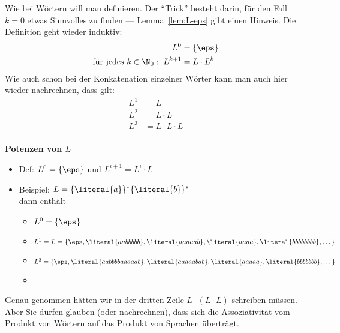 Wie bei Wörtern will man  definieren. 
%
Der "`Trick"' besteht darin, für den Fall $k=0$
etwas Sinnvolles zu finden --- Lemma~\ref{lem:L-eps} gibt einen Hinweis. 
%
Die Definition geht wieder induktiv:
\begin{align*}
  L^0 &= \{\eps\} \\
  \text{für jedes } k\in\N_0:\; L^{k+1} &= L \cdot L^k
\end{align*}
%
Wie auch schon bei der Konkatenation einzelner Wörter kann man auch hier
wieder nachrechnen, dass \zB gilt:
\begin{align*}
  L^1 &= L \\
  L^2 &= L\cdot L \\
  L^3 &= L\cdot L\cdot L \\
\end{align*}
%
\begin{tutorium}
  \noindent\textbf{Potenzen von $L$}

  \begin{itemize}
  \item Def: $L^0=\{\eps\}$ und $L^{i+1}=L^i\cdot L$
  \item Beispiel: $L=\{\literal{a}\}^*\{\literal{b}\}^*$\\
    dann enthält \zB 
    \begin{itemize}
    \item $L^0=\{\eps\}$
    \item $L^1=L=\{\eps, \literal{aabbbbb}, \literal{aaaaab}, \literal{aaaa},
      \literal{bbbbbbbb}, \dots \}$
    \item $L^2=\{\eps, \literal{aabbbbaaaaab}, \literal{aaaaabab}, \literal{aaaaa},
      \literal{bbbbbbb}, \dots \}$
    \item \usw
    \end{itemize}
  \end{itemize}
\end{tutorium}
Genau genommen hätten wir in der dritten Zeile $L\cdot (L\cdot L)$ schreiben
müssen. Aber Sie dürfen glauben (oder nachrechnen), dass sich die
Assoziativität vom Produkt von Wörtern auf das Produkt von Sprachen überträgt.

